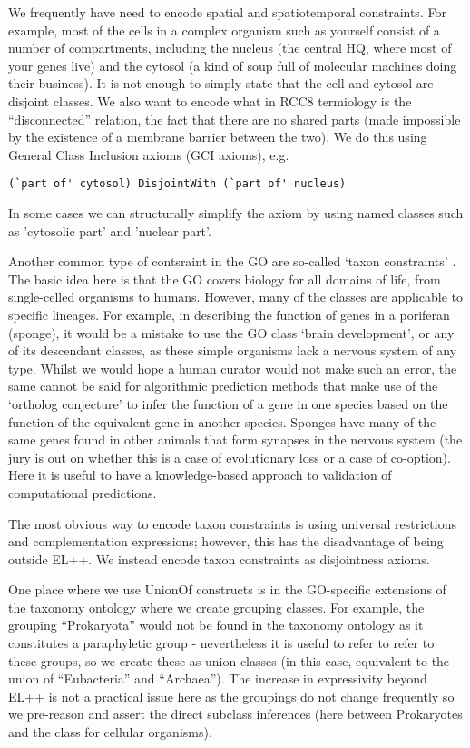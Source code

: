 \documentclass{llncs}
\begin{document}
We frequently have need to encode spatial and spatiotemporal
constraints. For example, most of the cells in a complex organism such
as yourself consist of a number of compartments, including the nucleus
(the central HQ, where most of your genes live) and the cytosol (a
kind of soup full of molecular machines doing their business). It is
not enough to simply state that the cell and cytosol are disjoint
classes. We also want to encode what in RCC8 termiology is the
``disconnected'' relation, the fact that there are no shared parts
(made impossible by the existence of a membrane barrier between the
two). We do this using General Class Inclusion axioms (GCI axioms),
e.g.  

\begin{verbatim}
(`part of' cytosol) DisjointWith (`part of' nucleus)
\end{verbatim}

In some cases we can structurally simplify the axiom by using named
classes such as 'cytosolic part' and 'nuclear part'.

Another common type of contsraint in the GO are so-called `taxon
constraints' \cite{Deegan2010}. The basic idea here is that the GO
covers biology for all domains of life, from single-celled organisms
to humans. However, many of the classes are applicable to specific
lineages. For example, in describing the function of genes in a
poriferan (sponge), it would be a mistake to use the GO class ‘brain
development’, or any of its descendant classes, as these simple
organisms lack a nervous system of any type. Whilst we would hope a
human curator would not make such an error, the same cannot be said
for algorithmic prediction methods that make use of the `ortholog
conjecture'\cite{Thomas2012} to infer the function of a gene in one
species based on the function of the equivalent gene in another
species. Sponges have many of the same genes found in other animals
that form synapses in the nervous system (the jury is out on whether
this is a case of evolutionary loss or a case of co-option). Here it
is useful to have a knowledge-based approach to validation of
computational predictions.

The most obvious way to encode taxon constraints is using universal
restrictions and complementation expressions; however, this has the
disadvantage of being outside EL++. We instead encode taxon
constraints as disjointness axioms\cite{taxonOWL}.

One place where we use UnionOf constructs is in the GO-specific
extensions of the taxonomy ontology where we create grouping
classes. For example, the grouping ``Prokaryota'' would not be found
in the taxonomy ontology as it constitutes a paraphyletic group -
nevertheless it is useful to refer to refer to these groups, so we
create these as union classes (in this case, equivalent to the union
of ``Eubacteria'' and ``Archaea''). The increase in expressivity
beyond EL++ is not a practical issue here as the groupings do not
change frequently so we pre-reason and assert the direct subclass
inferences (here between Prokaryotes and the class for cellular
organisms).
\end{document}
